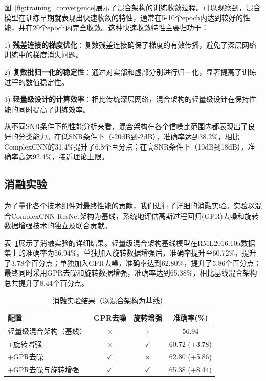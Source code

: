 \documentclass[conference]{IEEEtran}
\begin{document}
图~\ref{fig:training_convergence}展示了混合架构的训练收敛过程。可以观察到，混合模型在训练早期就表现出快速收敛的特性，通常在5-10个epoch内达到较好的性能，并在20个epoch内完全收敛。这种快速收敛特性主要归功于：

1) \textbf{残差连接的梯度优化}：复数残差连接确保了梯度的有效传播，避免了深层网络训练中的梯度消失问题。

2) \textbf{复数批归一化的稳定性}：通过对实部和虚部分别进行归一化，显著提高了训练过程的数值稳定性。

3) \textbf{轻量级设计的计算效率}：相比传统深层网络，混合架构的轻量级设计在保持性能的同时提高了训练效率。

从不同SNR条件下的性能分析来看，混合架构在各个信噪比范围内都表现出了良好的分类能力。在低SNR条件下（-20dB到-2dB），准确率达到38.2\%，相比ComplexCNN的31.4\%提升了6.8个百分点；在高SNR条件下（10dB到18dB），准确率高达92.4\%，接近理论上限。


\subsection{消融实验}

为了量化各个技术组件对最终性能的贡献，我们进行了详细的消融实验。实验以混合ComplexCNN-ResNet架构为基线，系统地评估高斯过程回归(GPR)去噪和旋转数据增强技术的独立及联合贡献。

表~\ref{tab:ablation_study}展示了消融实验的详细结果。轻量级混合架构基线模型在RML2016.10a数据集上的准确率为56.94\%。单独加入旋转数据增强后，准确率提升至60.72\%，提升了3.78个百分点；单独加入GPR去噪，准确率达到62.80\%，提升了5.86个百分点；最终同时采用GPR去噪和旋转数据增强，准确率达到65.38\%，相比基线混合架构总共提升了8.44个百分点。

\begin{table}[h]
\centering
\caption{消融实验结果（以混合架构为基线）}
\label{tab:ablation_study}
\begin{tabular}{@{}lccc@{}}
\toprule
配置 & GPR去噪 & 旋转增强 & 准确率(\%) \\
\midrule
轻量级混合架构（基线） & $\times$ & $\times$ & 56.94 \\
+旋转增强 & $\times$ & $\checkmark$ & 60.72 (+3.78) \\
+GPR去噪 & $\checkmark$ & $\times$ & 62.80 (+5.86) \\
+GPR去噪与旋转增强 & $\checkmark$ & $\checkmark$ & 65.38 (+8.44) \\
\bottomrule
\end{tabular}
\end{table}
\end{document}

